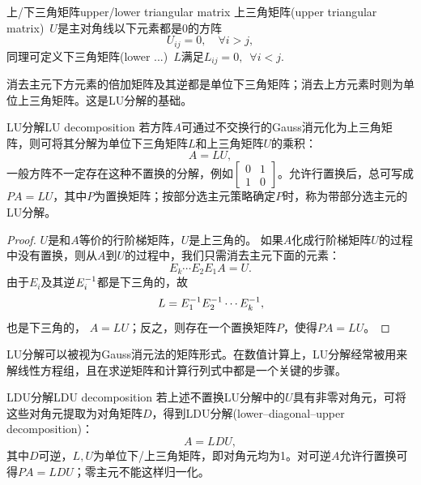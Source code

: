 \begin{definition}{上/下三角矩阵}{upper/lower triangular matrix}
	上三角矩阵(upper triangular matrix)~$U$是主对角线以下元素都是0的方阵
	\begin{equation}\label{eq:la-upper-triangular}
		U_{ij} = 0,\quad\forall i > j,
	\end{equation}
	同理可定义下三角矩阵(lower ...)~$L$满足$L_{ij} = 0,\enspace\forall i < j.$
\end{definition}
消去主元下方元素的倍加矩阵及其逆都是单位下三角矩阵；消去上方元素时则为单位上三角矩阵。这是LU分解的基础。
\begin{theorem}{LU分解}{LU decomposition}
	若方阵$A$可通过不交换行的Gauss消元化为上三角矩阵，则可将其分解为单位下三角矩阵$L$和上三角矩阵$U$的乘积：
	\begin{equation}
		A = LU,
	\end{equation}
	一般方阵不一定存在这种不置换的分解，例如$\begin{bmatrix}0&1\\1&0\end{bmatrix}$。允许行置换后，总可写成$PA = LU$，其中$P$为置换矩阵；按部分选主元策略确定$P$时，称为带部分选主元的LU分解。
\end{theorem}
\begin{proof}
	$U$是和$A$等价的行阶梯矩阵，$U$是上三角的。
	如果$A$化成行阶梯矩阵$U$的过程中没有置换，则从$A$到$U$的过程中，我们只需消去主元下面的元素：
	\[
		E_k\cdots E_2E_1A = U.
	\]
	由于$E_i$及其逆$E_i^{-1}$都是下三角的，故
	\[
		L = E_1^{-1} E_2^{-1}\cdots E_k^{-1},
	\]
	也是下三角的，%
	$A = LU$；反之，则存在一个置换矩阵$P$，使得$PA = LU$。
\end{proof}

\begin{remark}
	LU分解可以被视为Gauss消元法的矩阵形式。在数值计算上，LU分解经常被用来解线性方程组，且在求逆矩阵和计算行列式中都是一个关键的步骤。
\end{remark}

\begin{theorem}
	{LDU分解}{LDU decomposition}
	若上述不置换LU分解中的$U$具有非零对角元，可将这些对角元提取为对角矩阵$D$，得到LDU分解(lower--diagonal--upper decomposition)：
	\begin{equation}\label{eq:la-ldu}
		A = LDU,
	\end{equation}
	其中$D$可逆，$L,U$为单位下/上三角矩阵，即对角元均为1。对可逆$A$允许行置换可得$PA = LDU$；零主元不能这样归一化。
\end{theorem}

